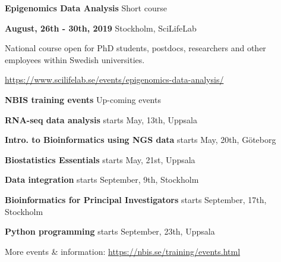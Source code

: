 \documentclass[12pt]{letter}\usepackage[]{graphicx}\usepackage[]{color}
\begin{document}
\Large

\textbf{Epigenomics Data Analysis}
\normalsize
Short course

\vspace{0.8cm}
\large
\begin{flushright} \textbf{August, 26th - 30th, 2019} %
\normalsize
Stockholm, SciLifeLab %
\tiny

National course open for PhD students, postdocs, researchers and other employees within Swedish universities.  

\small
\href{https://www.scilifelab.se/events/epigenomics-data-analysis}{https://www.scilifelab.se/events/epigenomics-data-analysis/}
\end{flushright} 

\vspace{0.2cm}
\normalsize

\newpage 
\cfoot{}
\Large
\begin{flushleft}
\textbf{NBIS training events}
\newline \normalsize
Up-coming events
\end{flushleft}
\vspace{0.5cm}
\begin{flushleft}


  \footnotesize \textbf{RNA-seq data analysis} \newline \scriptsize
  starts May, 13th, Uppsala
  
  \footnotesize \textbf{Intro. to Bioinformatics using NGS data} \newline \scriptsize
  starts May, 20th, G\"oteborg
  
  \footnotesize \textbf{Biostatistics Essentials} \newline \scriptsize
  starts May, 21st, Uppsala
  
  \footnotesize \textbf{Data integration} \newline \scriptsize
  starts September, 9th, Stockholm
  
  \footnotesize \textbf{Bioinformatics for Principal Investigators} \newline \scriptsize
  starts September, 17th, Stockholm
  
  \footnotesize \textbf{Python programming} \newline \scriptsize
  starts September, 23th, Uppsala
  
  
\vspace{1cm}
More events \& information: \newline
\href{https://nbis.se/training/events.html}{https://nbis.se/training/events.html}

\end{flushleft}
\end{document}
